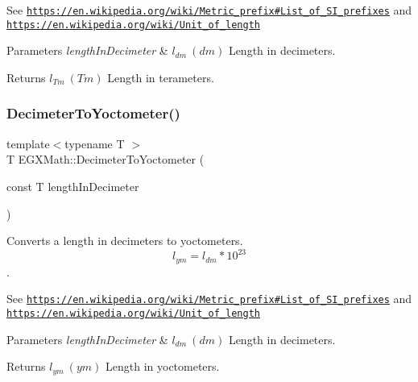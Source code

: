 See \href{https://en.wikipedia.org/wiki/Metric_prefix#List_of_SI_prefixes}{\tt https\+://en.\+wikipedia.\+org/wiki/\+Metric\+\_\+prefix\#\+List\+\_\+of\+\_\+\+S\+I\+\_\+prefixes} and \href{https://en.wikipedia.org/wiki/Unit_of_length}{\tt https\+://en.\+wikipedia.\+org/wiki/\+Unit\+\_\+of\+\_\+length} 
\begin{DoxyParams}{Parameters}
{\em length\+In\+Decimeter} & $ l_{dm}\ (dm)$ Length in decimeters. \\
\hline
\end{DoxyParams}
\begin{DoxyReturn}{Returns}
$ l_{Tm}\ (Tm)$ Length in terameters. 
\end{DoxyReturn}
\mbox{\label{group___e_g_x_math-_conversions-_length_conversions-_s_i-_decimeter-_s_i_ga9da3b12a8bfe244f7af0cc13cf0de4a8}} 
\subsubsection{\texorpdfstring{Decimeter\+To\+Yoctometer()}{DecimeterToYoctometer()}}
{\footnotesize\ttfamily template$<$typename T $>$ \\
T E\+G\+X\+Math\+::\+Decimeter\+To\+Yoctometer (\begin{DoxyParamCaption}\item[{const T}]{length\+In\+Decimeter }\end{DoxyParamCaption})}



Converts a length in decimeters to yoctometers. \[ l_{ym}=l_{dm} * 10^{23} \]. 

See \href{https://en.wikipedia.org/wiki/Metric_prefix#List_of_SI_prefixes}{\tt https\+://en.\+wikipedia.\+org/wiki/\+Metric\+\_\+prefix\#\+List\+\_\+of\+\_\+\+S\+I\+\_\+prefixes} and \href{https://en.wikipedia.org/wiki/Unit_of_length}{\tt https\+://en.\+wikipedia.\+org/wiki/\+Unit\+\_\+of\+\_\+length} 
\begin{DoxyParams}{Parameters}
{\em length\+In\+Decimeter} & $ l_{dm}\ (dm)$ Length in decimeters. \\
\hline
\end{DoxyParams}
\begin{DoxyReturn}{Returns}
$ l_{ym}\ (ym)$ Length in yoctometers. 
\end{DoxyReturn}
\mbox{\label{group___e_g_x_math-_conversions-_length_conversions-_s_i-_decimeter-_s_i_ga47bb0274bb352706479e9f103686669b}} 
